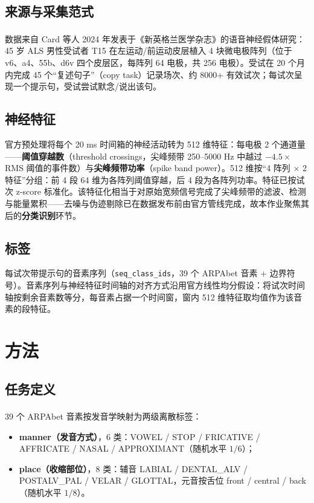 \documentclass[11pt,a4paper]{ctexart}
\begin{document}
\subsection{来源与采集范式}

数据来自 Card 等人 2024 年发表于《新英格兰医学杂志》的语音神经假体研究\textsuperscript{\cite{card2024}}：45 岁 ALS 男性受试者 T15 在左运动/前运动皮层植入 4 块微电极阵列（位于 v6、a4、55b、d6v 四个皮层区，每阵列 64 电极，共 256 电极）。受试在 20 个月内完成 45 个``复述句子''（copy task）记录场次、约 8000+ 有效试次；每试次呈现一个提示句，受试尝试默念/说出该句。

\subsection{神经特征}

官方预处理将每个 20 ms 时间箱的神经活动转为 512 维特征：每电极 2 个通道量——\textbf{阈值穿越数}（threshold crossings，尖峰频带 250--5000 Hz 中越过 $-4.5\times$RMS 阈值的事件数）与\textbf{尖峰频带功率}（spike band power）。512 维按``4 阵列 $\times$ 2 特征''分组：前 4 段 64 维为各阵列阈值穿越，后 4 段为各阵列功率。特征已按试次 z-score 标准化。该特征化相当于对原始宽频信号完成了尖峰频带的滤波、检测与能量累积——去噪与伪迹剔除已在数据发布前由官方管线完成，故本作业聚焦其后的\textbf{分类识别}环节。

\subsection{标签}

每试次带提示句的音素序列（\texttt{seq\_class\_ids}，39 个 ARPAbet 音素 + 边界符号）。音素序列与神经特征时间轴的对齐方式沿用官方线性均分假设：将试次时间轴按剩余音素数等分，每音素占据一个时间窗，窗内 512 维特征取均值作为该音素的段特征。

\section{方法}

\subsection{任务定义}

39 个 ARPAbet 音素按发音学映射为两级离散标签\textsuperscript{\cite{arpabet}}：

\begin{itemize}
\item \textbf{manner（发音方式）}，6 类：VOWEL / STOP / FRICATIVE / AFFRICATE / NASAL / APPROXIMANT（随机水平 $1/6$）；
\item \textbf{place（收缩部位）}，8 类：辅音 LABIAL / DENTAL\_ALV / POSTALV\_PAL / VELAR / GLOTTAL，元音按舌位 front / central / back（随机水平 $1/8$）。
\end{itemize}
\end{document}
